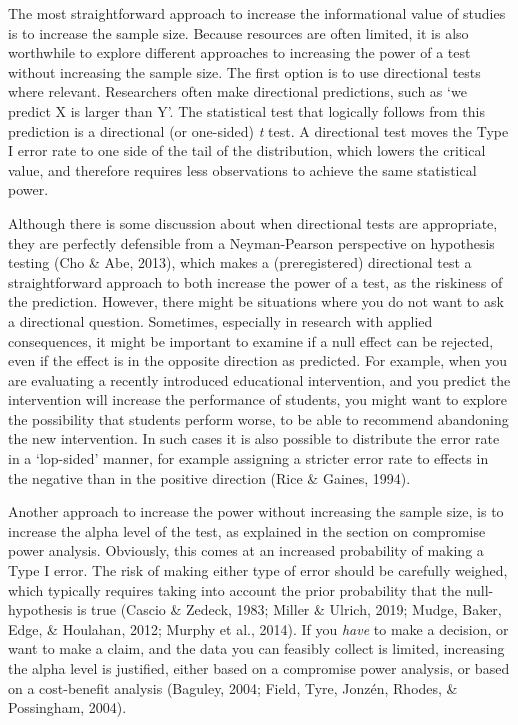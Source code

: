\documentclass[
  english,
  ,jou, a4paper,floatsintext]{apa6}
\begin{document}
The most straightforward approach to increase the informational value of studies is to increase the sample size. Because resources are often limited, it is also worthwhile to explore different approaches to increasing the power of a test without increasing the sample size. The first option is to use directional tests where relevant. Researchers often make directional predictions, such as `we predict X is larger than Y'. The statistical test that logically follows from this prediction is a directional (or one-sided) \emph{t} test. A directional test moves the Type I error rate to one side of the tail of the distribution, which lowers the critical value, and therefore requires less observations to achieve the same statistical power.

Although there is some discussion about when directional tests are appropriate, they are perfectly defensible from a Neyman-Pearson perspective on hypothesis testing (Cho \& Abe, 2013), which makes a (preregistered) directional test a straightforward approach to both increase the power of a test, as the riskiness of the prediction. However, there might be situations where you do not want to ask a directional question. Sometimes, especially in research with applied consequences, it might be important to examine if a null effect can be rejected, even if the effect is in the opposite direction as predicted. For example, when you are evaluating a recently introduced educational intervention, and you predict the intervention will increase the performance of students, you might want to explore the possibility that students perform worse, to be able to recommend abandoning the new intervention. In such cases it is also possible to distribute the error rate in a `lop-sided' manner, for example assigning a stricter error rate to effects in the negative than in the positive direction (Rice \& Gaines, 1994).

Another approach to increase the power without increasing the sample size, is to increase the alpha level of the test, as explained in the section on compromise power analysis. Obviously, this comes at an increased probability of making a Type I error. The risk of making either type of error should be carefully weighed, which typically requires taking into account the prior probability that the null-hypothesis is true (Cascio \& Zedeck, 1983; Miller \& Ulrich, 2019; Mudge, Baker, Edge, \& Houlahan, 2012; Murphy et al., 2014). If you \emph{have} to make a decision, or want to make a claim, and the data you can feasibly collect is limited, increasing the alpha level is justified, either based on a compromise power analysis, or based on a cost-benefit analysis (Baguley, 2004; Field, Tyre, Jonzén, Rhodes, \& Possingham, 2004).
\end{document}
